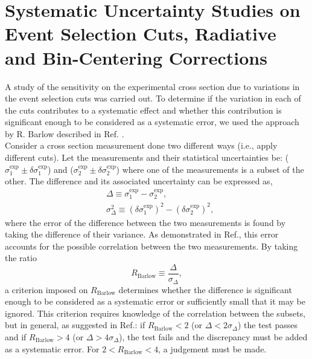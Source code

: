 \documentclass[aps, prl]{revtex4-2}  %
\begin{document}
\section{\large Systematic Uncertainty Studies on Event Selection Cuts, Radiative and Bin-Centering Corrections }
A study of the sensitivity on the experimental cross section due to variations in the event selection cuts was carried out. 
To determine if the variation in each of the cuts contributes to a systematic effect and whether this contribution is significant
enough to be considered as a systematic error, we used the approach by R. Barlow described in Ref. \cite{barlow2002systematic}.\\
\indent Consider a cross section measurement done two different ways (i.e., apply different cuts). Let the measurements and their
statistical uncertainties be: ($\sigma^{\mathrm{exp}}_{\mathrm{1}}\pm\delta\sigma^{\mathrm{exp}}_{\mathrm{1}}$) and ($\sigma^{\mathrm{exp}}_{\mathrm{2}}\pm\delta\sigma^{\mathrm{exp}}_{\mathrm{2}}$)
where one of the measurements is a subset of the other. The difference and its associated uncertainty can be expressed as,
\begin{subequations}
  \begin{align}
    &\Delta \equiv \sigma^{\mathrm{exp}}_{\mathrm{1}} - \sigma^{\mathrm{exp}}_{\mathrm{2}}, \\
    &\sigma^{2}_{\Delta} \equiv (\delta\sigma^{\mathrm{exp}}_{\mathrm{1}})^{2} - (\delta\sigma^{\mathrm{exp}}_{\mathrm{2}})^{2},
  \end{align}
\end{subequations}
where the error of the difference between the two measurements is found by taking the difference of their variance. As demonstrated in Ref.\cite{barlow2002systematic}, this
error accounts for the possible correlation between the two measurements. By taking the ratio
\begin{equation}
  R_{\mathrm{Barlow}} \equiv \frac{\Delta}{\sigma_{\Delta}},
\end{equation}
a criterion imposed on $R_{\mathrm{Barlow}}$ determines whether the difference is significant enough to be considered as a systematic error or sufficiently small that it may be
ignored. This criterion requires knowledge of the correlation between the subsets, but in general, as suggested in Ref.\cite{barlow2017}: if $R_{\mathrm{Barlow}} < 2$ (or $\Delta <2\sigma_{\Delta}$)
the test passes and if $R_{\mathrm{Barlow}} > 4$ (or $\Delta >4\sigma_{\Delta}$), the test fails and the discrepancy must be added as a systematic error. For $2<R_{\mathrm{Barlow}}<4$, a judgement must be made.\\
\end{document}
